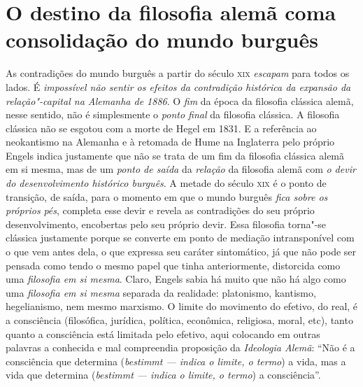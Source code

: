 \section*{O destino da filosofia alemã com\break a consolidação do mundo burguês}

As contradições do mundo burguês a partir do século \textsc{xix}
\emph{escapam} para todos os lados. É \emph{impossível não sentir os
efeitos da contradição histórica da expansão da relação"-capital na
Alemanha de 1886}. O \emph{fim} da época da filosofia clássica alemã,
nesse sentido, não é simplesmente o \emph{ponto final} da filosofia
clássica. A filosofia clássica não se esgotou com a morte de Hegel em
1831. E a referência ao neokantismo na Alemanha e à retomada de Hume na
Inglaterra pelo próprio Engels indica justamente que não se trata de um
fim da filosofia clássica alemã em si mesma, mas de um \emph{ponto de
saída} da \emph{relação} da filosofia alemã com \emph{o devir do
desenvolvimento histórico burguês}. A metade do século \textsc{xix} é o
ponto de transição, de saída, para o momento em que o mundo burguês
\emph{fica sobre os próprios} \emph{pés}, completa esse devir e revela
as contradições do seu próprio desenvolvimento, encobertas pelo seu
próprio devir. Essa filosofia torna"-se clássica justamente porque se
converte em ponto de mediação intransponível com o que vem antes dela, o
que expressa seu caráter sintomático, já que não pode ser pensada como
tendo o mesmo papel que tinha anteriormente, distorcida como uma
\emph{filosofia em si mesma}. Claro, Engels sabia há muito que não há
algo como uma \emph{filosofia em si mesma} separada da realidade:
platonismo, kantismo, hegelianismo, nem mesmo marxismo. O limite do
movimento do efetivo, do real, é a consciência (filosófica, jurídica,
política, econômica, religiosa, moral, etc), tanto quanto a consciência
está limitada pelo efetivo, aqui colocando em outras palavras a
conhecida e mal compreendia proposição da \emph{Ideologia Alemã}: ``Não
é a consciência que determina (\emph{bestimmt --- indica o limite, o
termo}) a vida, mas a vida que determina (\emph{bestimmt --- indica o
limite, o termo}) a consciência''.

